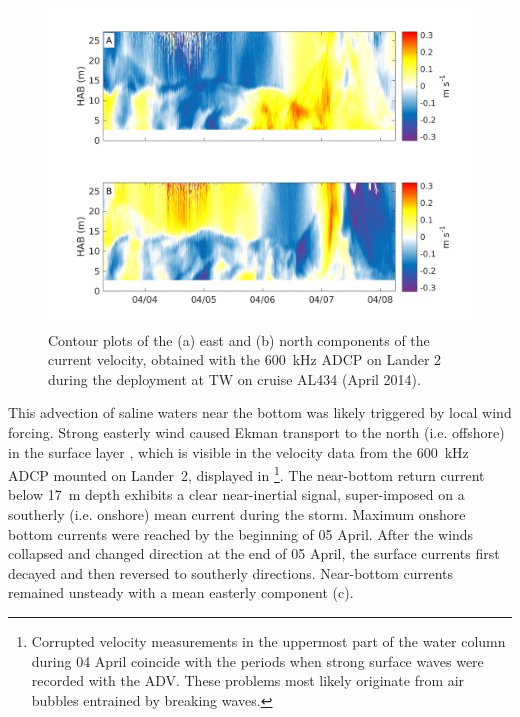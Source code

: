  \begin{figure}[ht]
\includegraphics[width=40pc]{bilder/adcp600.png}
 \caption{Contour plots of the (a) east and (b) north components of the 
current velocity, obtained with the 600~kHz ADCP on 
Lander 2 during the deployment at TW on cruise AL434 (April 2014).}
 \label{adcp600}
 \end{figure}
 
 This advection of saline waters near the bottom was likely triggered by local 
wind 
forcing. Strong easterly wind caused Ekman transport to the north (i.e. 
offshore) in the surface layer \citep[][]{lass2001}, 
which is visible in the 
velocity data from the 600~kHz ADCP mounted on Lander~2, displayed in 
\footnote{Corrupted velocity measurements in the uppermost part of 
the water column during 04 April coincide with the periods when strong surface 
waves were recorded with the ADV. These problems most likely originate from 
air bubbles entrained by breaking waves.}. The near-bottom return current below 
17~m depth exhibits a clear near-inertial signal, super-imposed on a southerly 
(i.e. onshore) mean current during the storm. Maximum onshore bottom currents 
were reached by the beginning of 05 April. After the winds collapsed and 
changed 
direction at the end of 05 April, the surface currents 
first decayed and then reversed to southerly directions. Near-bottom 
currents remained unsteady with a mean easterly component (c).

